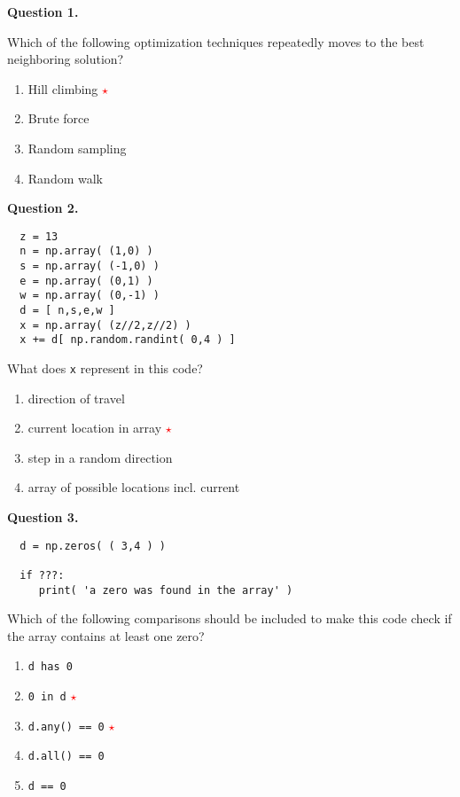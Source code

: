 \documentclass[12pt]{article}
\newcommand{\correctstar}{{\Large\textcolor{red}{$\star$}}}
\begin{document}
\bigskip

\bigskip


{\bf Question 1.}     

Which of the following optimization techniques repeatedly moves to the best neighboring solution?

\begin{enumerate}[label=\Alph*]
	\item  Hill climbing  \correctstar
	\item  Brute force
	\item  Random sampling
	\item  Random walk
\end{enumerate}



{\bf Question 2.} 
  \begin{Verbatim}
  z = 13
  n = np.array( (1,0) )
  s = np.array( (-1,0) )
  e = np.array( (0,1) )
  w = np.array( (0,-1) )
  d = [ n,s,e,w ]
  x = np.array( (z//2,z//2) )
  x += d[ np.random.randint( 0,4 ) ]
  \end{Verbatim}
  
  What does \texttt{x} represent in this code?
  
  \begin{enumerate}[label=\Alph*]
  	\item  direction of travel
  	\item  current location in array  \correctstar
  	\item  step in a random direction
  	\item  array of possible locations incl. current
  \end{enumerate}

{\bf Question 3.} 
  \begin{Verbatim}
  d = np.zeros( ( 3,4 ) )
  
  if ???:
     print( 'a zero was found in the array' )
  \end{Verbatim}
  
  Which of the following comparisons should be included to make this code check if the array contains at least one zero?
  
  \begin{enumerate}[label=\Alph*]
  	\item  \texttt{d has 0}
  	\item  \texttt{0 in d} \correctstar
  	\item  \texttt{d.any() == 0} \correctstar
  	\item  \texttt{d.all() == 0}
  	\item  \texttt{d == 0}
  \end{enumerate}
\end{document}
